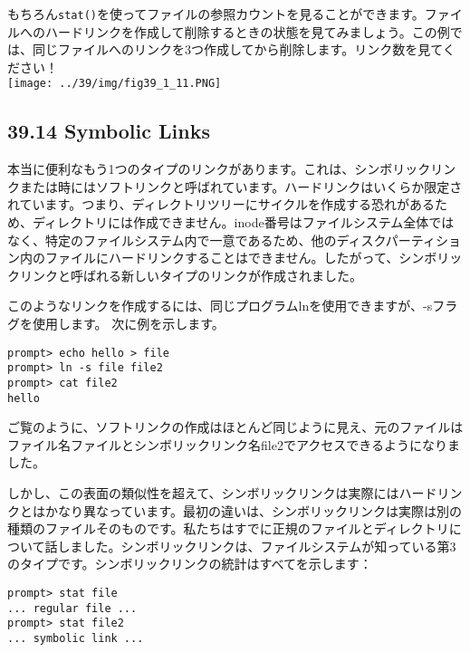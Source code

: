 もちろん\texttt{stat()}を使ってファイルの参照カウントを見ることができます。ファイルへのハードリンクを作成して削除するときの状態を見てみましょう。この例では、同じファイルへのリンクを3つ作成してから削除します。リンク数を見てください！\\
\texttt{[image: ../39/img/fig39\_1\_11.PNG]}

\hypertarget{symbolic-links}{%
\subsection*{39.14 Symbolic Links}\label{symbolic-links}}

本当に便利なもう1つのタイプのリンクがあります。これは、シンボリックリンクまたは時にはソフトリンクと呼ばれています。ハードリンクはいくらか限定されています。つまり、ディレクトリツリーにサイクルを作成する恐れがあるため、ディレクトリには作成できません。inode番号はファイルシステム全体ではなく、特定のファイルシステム内で一意であるため、他のディスクパーティション内のファイルにハードリンクすることはできません。したがって、シンボリックリンクと呼ばれる新しいタイプのリンクが作成されました。

このようなリンクを作成するには、同じプログラムlnを使用できますが、-sフラグを使用します。
次に例を示します。

\begin{verbatim}
prompt> echo hello > file
prompt> ln -s file file2
prompt> cat file2
hello
\end{verbatim}

ご覧のように、ソフトリンクの作成はほとんど同じように見え、元のファイルはファイル名ファイルとシンボリックリンク名file2でアクセスできるようになりました。

しかし、この表面の類似性を超えて、シンボリックリンクは実際にはハードリンクとはかなり異なっています。最初の違いは、シンボリックリンクは実際は別の種類のファイルそのものです。私たちはすでに正規のファイルとディレクトリについて話しました。シンボリックリンクは、ファイルシステムが知っている第3のタイプです。シンボリックリンクの統計はすべてを示します：

\begin{verbatim}
prompt> stat file
... regular file ...
prompt> stat file2
... symbolic link ...
\end{verbatim}

